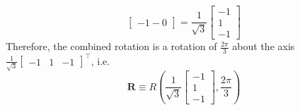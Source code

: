 \documentclass[10pt]{article}
\begin{document}
\begin{enumerate}
\begin{equation*}
\begin{bmatrix}
                -1 - 0
            \end{bmatrix} = \frac{1}{\sqrt{3}} \begin{bmatrix}
                -1 \\
                1 \\
                -1
            \end{bmatrix}
        \end{equation*}
        Therefore, the combined rotation is a rotation of $\frac{2\pi}{3}$ about the axis
        $\frac{1}{\sqrt{3}} \begin{bmatrix} -1 & 1 & -1 \end{bmatrix}^{\top}$,
        i.e.
        \begin{equation*}
            \mathbf{R} \equiv R\left(\frac{1}{\sqrt{3}} \begin{bmatrix}
                -1  \\
                1 \\
                -1
            \end{bmatrix}, \frac{2\pi}{3}\right)
        \end{equation*}


\end{enumerate}
\end{document}
